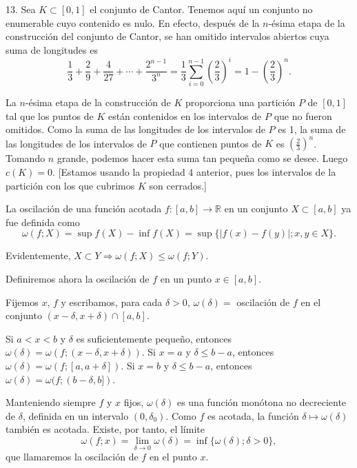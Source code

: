 \documentclass[12pt,oneside]{book}
\begin{document}
13. Sea \( K \subset [0, 1] \) el conjunto de Cantor. Tenemos aquí un conjunto no enumerable cuyo contenido es nulo. En efecto, después de la \( n \)-ésima etapa de la construcción del conjunto de Cantor, se han omitido intervalos abiertos cuya suma de longitudes es
\[
\frac{1}{3} + \frac{2}{9} + \frac{4}{27} + \cdots + \frac{2^{n-1}}{3^n} = \frac{1}{3} \sum_{i=0}^{n-1} \left( \frac{2}{3} \right)^i = 1 - \left( \frac{2}{3} \right)^n.
\]

La \( n \)-ésima etapa de la construcción de \( K \) proporciona una partición \( P \) de \( [0, 1] \) tal que los puntos de \( K \) están contenidos en los intervalos de \( P \) que no fueron omitidos. Como la suma de las longitudes de los intervalos de \( P \) es 1, la suma de las longitudes de los intervalos de \( P \) que contienen puntos de \( K \) es \( \left( \frac{2}{3} \right)^n \). Tomando \( n \) grande, podemos hacer esta suma tan pequeña como se desee. Luego \( c(K) = 0 \). [Estamos usando la propiedad 4 anterior, pues los intervalos de la partición con los que cubrimos \( K \) son cerrados.]

La oscilación de una función acotada \( f: [a, b] \to \mathbb{R} \) en un conjunto \( X \subset [a, b] \) ya fue definida como
\[
\omega(f; X) = \sup f(X) - \inf f(X) = \sup\{|f(x) - f(y)|; x, y \in X\}.
\]

Evidentemente, \( X \subset Y \Rightarrow \omega(f; X) \leq \omega(f; Y) \).

Definiremos ahora la oscilación de \( f \) en un punto \( x \in [a, b] \).

Fijemos \( x \), \( f \) y escribamos, para cada \( \delta > 0 \), \( \omega(\delta) = \) oscilación de \( f \) en el conjunto \( (x - \delta, x + \delta) \cap [a, b] \).

Si \(a < x < b\) y \(\delta\) es suficientemente pequeño, entonces \(\omega(\delta) = \omega(f; (x - \delta, x + \delta))\). Si \(x = a\) y \(\delta \leq b - a\), entonces \(\omega(\delta) = \omega(f; [a, a + \delta])\). Si \(x = b\) y \(\delta \leq b - a\), entonces \(\omega(\delta) = \omega(f; (b - \delta, b])\).

Manteniendo siempre \(f\) y \(x\) fijos, \(\omega(\delta)\) es una función monótona no decreciente de \(\delta\), definida en un intervalo \((0, \delta_0)\). Como \(f\) es acotada, la función \(\delta \mapsto \omega(\delta)\) también es acotada. Existe, por tanto, el límite
\[
\omega(f; x) = \lim_{\delta \to 0} \omega(\delta) = \inf\{\omega(\delta); \delta > 0\},
\]
que llamaremos la oscilación de \(f\) en el punto \(x\).
\end{document}
